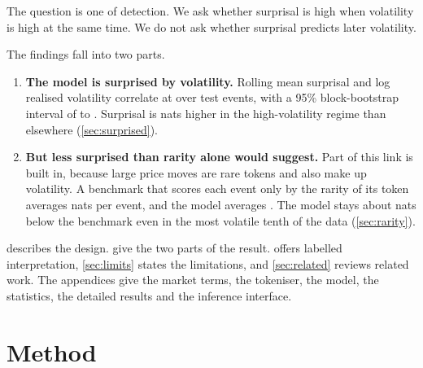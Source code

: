 \documentclass[11pt]{article}
\begin{document}
The question is one of detection.
We ask whether surprisal is high when volatility is high at the same time.
We do not ask whether surprisal predicts later volatility.

The findings fall into two parts.
\begin{enumerate}
  \item \textbf{The model is surprised by volatility.}
  Rolling mean surprisal and log realised volatility correlate at \Corr{} over \NEval{} test events, with a 95\% block-bootstrap interval of \CorrLo{} to \CorrHi{}.
  Surprisal is \SurpGap{} nats higher in the high-volatility regime than elsewhere (\cref{sec:surprised}).
  \item \textbf{But less surprised than rarity alone would suggest.}
  Part of this link is built in, because large price moves are rare tokens and also make up volatility.
  A benchmark that scores each event only by the rarity of its token averages \MeanRar{} nats per event, and the model averages \MeanSurp{}.
  The model stays about \GapHigh{} nats below the benchmark even in the most volatile tenth of the data (\cref{sec:rarity}).
\end{enumerate}

 describes the design.
 give the two parts of the result.
 offers labelled interpretation, \cref{sec:limits} states the limitations, and \cref{sec:related} reviews related work.
The appendices give the market terms, the tokeniser, the model, the statistics, the detailed results and the inference interface.

\section{Method}\label{sec:method}
\end{document}
